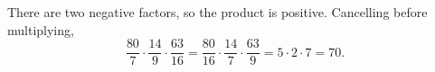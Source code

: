 There are two negative factors, so the product is positive. Cancelling before multiplying,
\[\dfrac{80}{7}\cdot\dfrac{14}{9}\cdot\dfrac{63}{16}=\dfrac{80}{16}\cdot\dfrac{14}{7}\cdot\dfrac{63}{9}=5\cdot2\cdot7=\boxed{70}.\]

